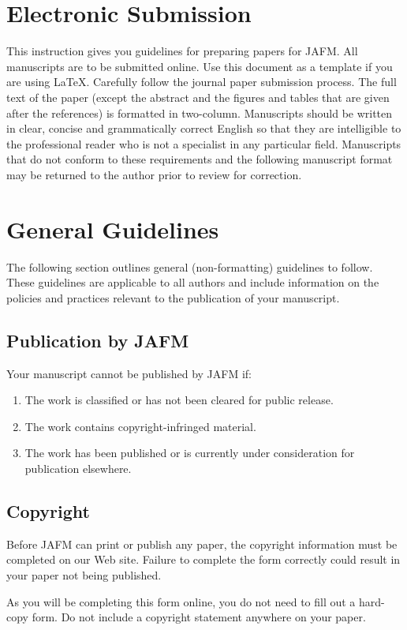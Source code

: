 \documentclass{jafm}
\begin{document}
\section{Electronic Submission}
This instruction gives you guidelines for preparing papers for JAFM. All manuscripts are to be submitted online. Use this document as a template if you are using \LaTeX. Carefully follow the journal paper submission process. The full text of the paper (except the abstract and the figures and tables that are given after the references) is formatted in two-column. Manuscripts should be written in clear, concise and grammatically correct English so that they are intelligible to the professional reader who is not a specialist in any particular field. Manuscripts that do not conform to these requirements and the following manuscript format may be returned to the author prior to review for correction.
\section{General Guidelines}
The following section outlines general (non-formatting) guidelines to follow. These guidelines are applicable to all authors and include information on the policies and practices relevant to the publication of your manuscript.
\subsection{Publication by JAFM}
Your manuscript cannot be published by JAFM if:
\begin{enumerate}
\item
The work is classified or has not been cleared for public release.
\item
The work contains copyright-infringed material.
\item
The work has been published or is currently under consideration for publication elsewhere.
\end{enumerate}
\subsection{Copyright}
Before JAFM can print or publish any paper, the copyright information must be completed on our Web site. Failure to complete the form correctly could result in your paper not being published.

As you will be completing this form online, you do not need to fill out a hard-copy form. Do not include a copyright statement anywhere on your paper.
\end{document}
